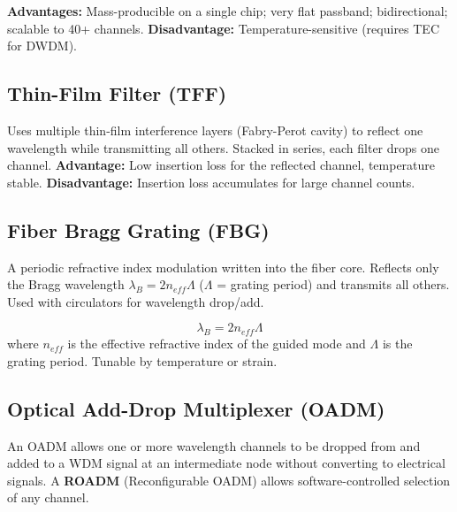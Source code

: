 \documentclass[12pt,a4paper]{article}
\begin{document}
\textbf{Advantages:} Mass-producible on a single chip; very flat passband; bidirectional; scalable to 40+ channels. \textbf{Disadvantage:} Temperature-sensitive (requires TEC for DWDM).

\subsection{Thin-Film Filter (TFF)}
Uses multiple thin-film interference layers (Fabry-Perot cavity) to reflect one wavelength while transmitting all others. Stacked in series, each filter drops one channel. \textbf{Advantage:} Low insertion loss for the reflected channel, temperature stable. \textbf{Disadvantage:} Insertion loss accumulates for large channel counts.

\subsection{Fiber Bragg Grating (FBG)}
A periodic refractive index modulation written into the fiber core. Reflects only the Bragg wavelength $\lambda_B = 2n_{eff}\Lambda$ ($\Lambda$ = grating period) and transmits all others. Used with circulators for wavelength drop/add.

\begin{tcolorbox}[formulabox, title={\textbf{FBG Bragg Condition}}]
\[
\lambda_B = 2 n_{eff} \Lambda
\]
where $n_{eff}$ is the effective refractive index of the guided mode and $\Lambda$ is the grating period. Tunable by temperature or strain.
\end{tcolorbox}

\subsection{Optical Add-Drop Multiplexer (OADM)}
An OADM allows one or more wavelength channels to be dropped from and added to a WDM signal at an intermediate node without converting to electrical signals. A \textbf{ROADM} (Reconfigurable OADM) allows software-controlled selection of any channel.
\end{document}
